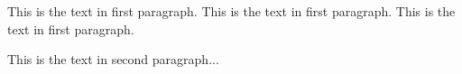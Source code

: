 This is the text in first paragraph. This is the text in first 
paragraph. This is the text in first paragraph. \par
This is the text in second paragraph...